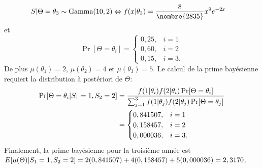 \begin{exercice}
\begin{sol}
\begin{align*}
      S|\Theta = \theta_3
      &\sim \text{Gamma}(10, 2) \Leftrightarrow
      f(x|\theta_3) = \frac{8}{\nombre{2835}} x^9 e^{-2x}
    \end{align*}
    et
    \begin{equation*}
      \Pr[\Theta = \theta_i] =
      \begin{cases}
        0,25, & i = 1 \\
        0,60, & i = 2 \\
        0,15, & i = 3.
      \end{cases}
    \end{equation*}
    De plus $\mu(\theta_1) = 2$, $\mu(\theta_2) = 4$ et $\mu(\theta_3)
    = 5$.  Le calcul de la prime bayésienne requiert la distribution à
    postériori de $\Theta$:
    \begin{align*}
      \Pr[\Theta = \theta_i|S_1 = 1, S_2 = 2]
      &= \frac{f(1|\theta_i) f(2|\theta_i) \Pr[\Theta = \theta_i]}{%
        \sum_{j=1}^3 f(1|\theta_j) f(2|\theta_j)
        \Pr[\Theta = \theta_j]} \\
      &=
      \begin{cases}
        0,841507, & i = 1 \\
        0,158457, & i = 2 \\
        0,000036, & i = 3.
      \end{cases}
    \end{align*}
    Finalement, la prime bayésienne pour la troisième année est
    $E [ \mu(\Theta)|S_1 = 1, S_2 = 2 ] = 2 (0,841507) + 4(0,158457) +
    5(0,000036) = 2,3170$.
  \end{sol}
\end{exercice}


